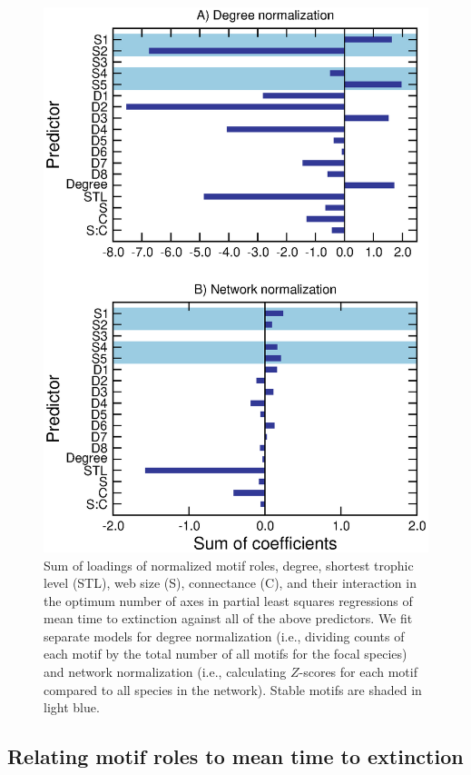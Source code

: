 \documentclass[12pt]{article}
\begin{document}
		\begin{figure}[h!]
			\caption{Sum of loadings of normalized motif roles, degree, shortest trophic level (STL), web size (S), connectance (C), and their interaction in the optimum number of axes in partial least squares regressions of mean time to extinction against all of the above predictors. We fit separate models for degree normalization (i.e., dividing counts of each motif by the total number of all motifs for the focal species) and network normalization (i.e., calculating $Z$-scores for each motif compared to all species in the network). Stable motifs are shaded in light blue.}
			\label{coefficient_sum}
			\includegraphics[height=0.5\textheight]{figures/PLS/total_coefficients.eps}

			\end{figure}


	\subsection*{Relating motif roles to mean time to extinction} 
\end{document}
